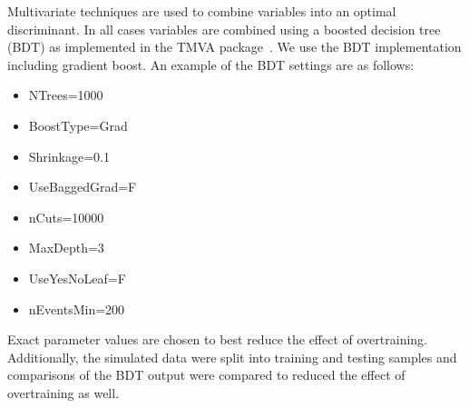 \noindent

Multivariate techniques are used to combine variables into an optimal discriminant.  
In all cases variables are combined using a boosted decision tree (BDT) as implemented in the TMVA package~\cite{Hocker:2007ht}.
We use the BDT implementation including gradient boost.  
An example of the BDT settings are as follows: 
\begin{itemize}
\item NTrees=1000
\item BoostType=Grad
\item Shrinkage=0.1
\item UseBaggedGrad=F
\item nCuts=10000
\item MaxDepth=3
\item UseYesNoLeaf=F
\item nEventsMin=200
\end{itemize}
Exact parameter values are chosen to best reduce the effect of overtraining.
Additionally, the simulated data were split into training and testing samples and comparisons of the BDT output were compared to reduced the effect of overtraining as well.  
